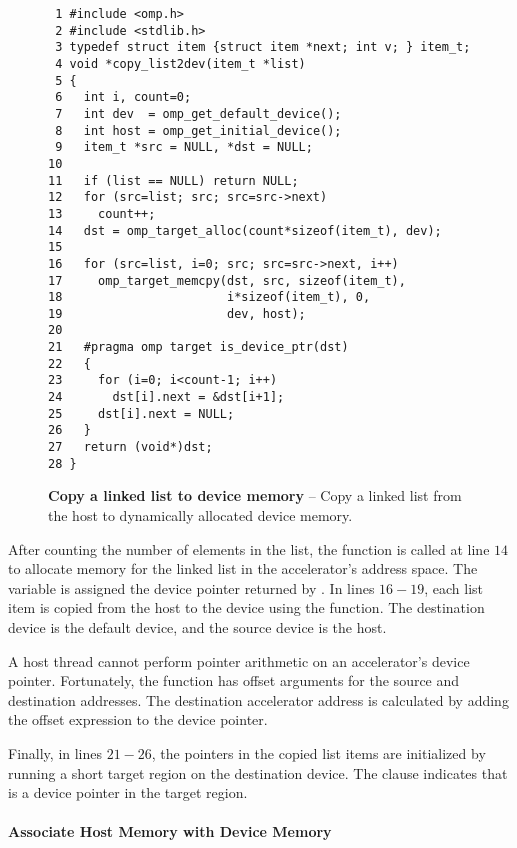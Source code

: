 \begin{figure*}[!tb]
\begin{verbatim}
 1 #include <omp.h>
 2 #include <stdlib.h>
 3 typedef struct item {struct item *next; int v; } item_t;
 4 void *copy_list2dev(item_t *list)
 5 {
 6   int i, count=0;
 7   int dev  = omp_get_default_device();
 8   int host = omp_get_initial_device();
 9   item_t *src = NULL, *dst = NULL;
10 
11   if (list == NULL) return NULL;
12   for (src=list; src; src=src->next)
13     count++;
14   dst = omp_target_alloc(count*sizeof(item_t), dev);
15   
16   for (src=list, i=0; src; src=src->next, i++)
17     omp_target_memcpy(dst, src, sizeof(item_t),
18                       i*sizeof(item_t), 0,
19                       dev, host);
20                       
21   #pragma omp target is_device_ptr(dst)
22   {
23     for (i=0; i<count-1; i++)
24       dst[i].next = &dst[i+1];
25     dst[i].next = NULL;
26   } 
27   return (void*)dst;
28 } 
\end{verbatim}
\caption{ \textbf {Copy a linked list to device memory} -- \small
          Copy a linked list from the host to dynamically allocated
          device memory.
         }
\label{figure:chapter6-alloc}
\end{figure*}

After counting the number of elements in the list, the 
function is called at line $14$ to allocate memory for the linked list in the
accelerator's address space.   The variable  is assigned the device
pointer returned by .  In lines $16-19$, each list item
is copied from the host to the device using the 
function.  The destination device is the default device, and the source device
is the host.

A host thread cannot perform pointer arithmetic on an accelerator's device
pointer.  Fortunately, the  function has offset
arguments for the source and destination addresses.  The destination
accelerator address is calculated by adding the  offset
expression to the  device pointer.

Finally, in lines $21-26$, the  pointers in the copied list items are
initialized by running a short target region on the destination device.  The
 clause indicates that  is a device pointer in the
target region.

\paragraph{Associate Host Memory with Device Memory}


